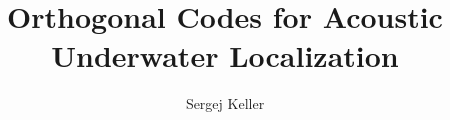 \documentclass[en,print,inputenc=utf8]{tuhhthesis}
\author{Sergej Keller}
\title{Orthogonal Codes for Acoustic Underwater Localization}
\institute{InstAutonomousCPS}
\begin{document}



%



%
%
%
%
%




\begin{tuhhappendix}
  
\end{tuhhappendix}


\end{document}
